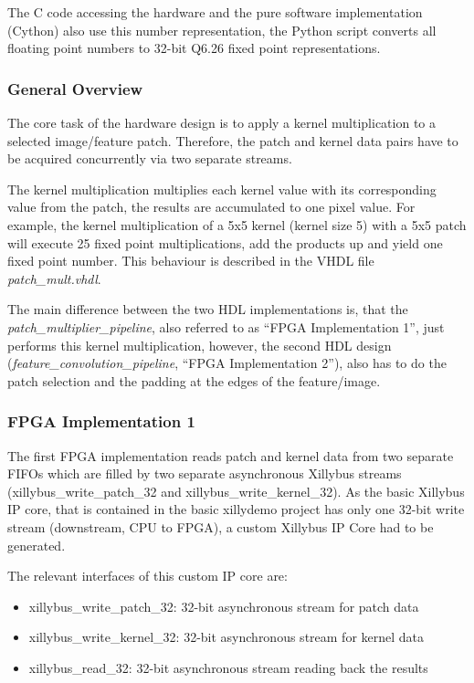 \documentclass[
			fontsize = 12pt,
			paper = a4
			]
			{scrartcl}%
\newcommand{\?}{\ensuremath{^\texttt{\textbf [CITATION~NEEDED]}}}
\begin{document}
The C code accessing the hardware and the pure software implementation (Cython) also use this number representation, the Python script converts all floating point numbers to 32-bit Q6.26 fixed point representations.

\subsubsection{General Overview}

The core task of the hardware design is to apply a kernel multiplication to a selected image/feature patch.
Therefore, the patch and kernel data pairs have to be acquired concurrently via two separate streams.

The kernel multiplication multiplies each kernel value with its corresponding value from the patch, the results are accumulated to one pixel value.
For example, the kernel multiplication of a 5x5 kernel (kernel size 5) with a 5x5 patch will execute 25 fixed point multiplications, add the products up and yield one fixed point number.
This behaviour is described in the VHDL file \emph{patch\_mult.vhdl}.

The main difference between the two HDL implementations is,
that the \emph{patch\_mul\allowbreak ti\allowbreak plier\_pipe\allowbreak line}, also referred to as \enquote{FPGA Implementation 1}, just performs this kernel multiplication, however, the second HDL design (\emph{fea\allowbreak ture\_convo\allowbreak lution\_pipe\allowbreak line}, \enquote{FPGA Implementation 2}), also has to do the patch selection and the padding at the edges of the feature/image.

\subsubsection{FPGA Implementation 1}
\label{sec:fpgaimpl1}

The first FPGA implementation reads patch and kernel data from two separate FIFOs which are filled by two separate asynchronous Xillybus streams (xillybus\_write\_patch\_32 and xillybus\_write\_kernel\_32).
As the basic Xillybus IP core, that is contained in the basic xillydemo project has only one 32-bit write stream (downstream, CPU to FPGA), a custom Xillybus IP Core had to be generated.

The relevant interfaces of this custom IP core are:
\begin{itemize}
  \item xillybus\_write\_patch\_32: 32-bit asynchronous stream for patch data
  \item xillybus\_write\_kernel\_32: 32-bit asynchronous stream for kernel data
  \item xillybus\_read\_32: 32-bit asynchronous stream reading back the results
\end{itemize}
\end{document}
